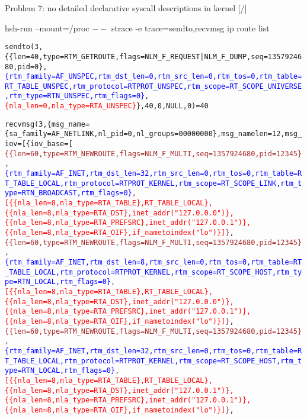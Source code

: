 \documentclass[unicode,aspectratio=169]{beamer}
\begin{document}
\begin{frame}{Problem 7: no detailed declarative syscall descriptions in kernel \hfill [\insertframenumber/\inserttotalframenumber]}
\begin{block}{hsh-run --mount=/proc $--$ strace -e trace=sendto,recvmsg ip route list}
\tiny
\begin{alltt}
sendto(3, \{\{len=40, type=RTM\_GETROUTE, flags=NLM\_F\_REQUEST|NLM\_F\_DUMP, seq=1357924680, pid=0\},
 \textcolor{blue}{\{rtm\_family=AF\_UNSPEC, rtm\_dst\_len=0, rtm\_src\_len=0, rtm\_tos=0, rtm\_table=RT\_TABLE\_UNSPEC, rtm\_protocol=RTPROT\_UNSPEC, rtm\_scope=RT\_SCOPE\_UNIVERSE, rtm\_type=RTN\_UNSPEC, rtm\_flags=0\}},
  \textcolor{red}{\{nla\_len=0, nla\_type=RTA\_UNSPEC\}}\}, 40, 0, NULL, 0) = 40

\smallskip
recvmsg(3, \{msg\_name=\{sa\_family=AF\_NETLINK, nl\_pid=0, nl\_groups=00000000\}, msg\_namelen=12, msg\_iov=[\{iov\_base=[
\textcolor{brown}{\{\{len=60, type=RTM\_NEWROUTE, flags=NLM\_F\_MULTI, seq=1357924680, pid=12345\},
 \textcolor{blue}{\{rtm\_family=AF\_INET, rtm\_dst\_len=32, rtm\_src\_len=0, rtm\_tos=0, rtm\_table=RT\_TABLE\_LOCAL, rtm\_protocol=RTPROT\_KERNEL, rtm\_scope=RT\_SCOPE\_LINK, rtm\_type=RTN\_BROADCAST, rtm\_flags=0\}},
  \textcolor{red}{[\{\{nla\_len=8, nla\_type=RTA\_TABLE\}, RT\_TABLE\_LOCAL\}, \{\{nla\_len=8, nla\_type=RTA\_DST\}, inet\_addr("127.0.0.0")\}, \{\{nla\_len=8, nla\_type=RTA\_PREFSRC\}, inet\_addr("127.0.0.1")\}, \{\{nla\_len=8, nla\_type=RTA\_OIF\}, if\_nametoindex("lo")\}]}\}},
\textcolor{brown}{\{\{len=60, type=RTM\_NEWROUTE, flags=NLM\_F\_MULTI, seq=1357924680, pid=12345\},
 \textcolor{blue}{\{rtm\_family=AF\_INET, rtm\_dst\_len=8, rtm\_src\_len=0, rtm\_tos=0, rtm\_table=RT\_TABLE\_LOCAL, rtm\_protocol=RTPROT\_KERNEL, rtm\_scope=RT\_SCOPE\_HOST, rtm\_type=RTN\_LOCAL, rtm\_flags=0\}},
  \textcolor{red}{[\{\{nla\_len=8, nla\_type=RTA\_TABLE\}, RT\_TABLE\_LOCAL\}, \{\{nla\_len=8, nla\_type=RTA\_DST\}, inet\_addr("127.0.0.0")\}, \{\{nla\_len=8, nla\_type=RTA\_PREFSRC\}, inet\_addr("127.0.0.1")\}, \{\{nla\_len=8, nla\_type=RTA\_OIF\}, if\_nametoindex("lo")\}]}\}},
\textcolor{brown}{\{\{len=60, type=RTM\_NEWROUTE, flags=NLM\_F\_MULTI, seq=1357924680, pid=12345\},
 \textcolor{blue}{\{rtm\_family=AF\_INET, rtm\_dst\_len=32, rtm\_src\_len=0, rtm\_tos=0, rtm\_table=RT\_TABLE\_LOCAL, rtm\_protocol=RTPROT\_KERNEL, rtm\_scope=RT\_SCOPE\_HOST, rtm\_type=RTN\_LOCAL, rtm\_flags=0\}},
  \textcolor{red}{[\{\{nla\_len=8, nla\_type=RTA\_TABLE\}, RT\_TABLE\_LOCAL\}, \{\{nla\_len=8, nla\_type=RTA\_DST\}, inet\_addr("127.0.0.1")\}, \{\{nla\_len=8, nla\_type=RTA\_PREFSRC\}, inet\_addr("127.0.0.1")\}, \{\{nla\_len=8, nla\_type=RTA\_OIF\}, if\_nametoindex("lo")\}]}\}},

\end{alltt}
\end{block}
\end{frame}
\end{document}
